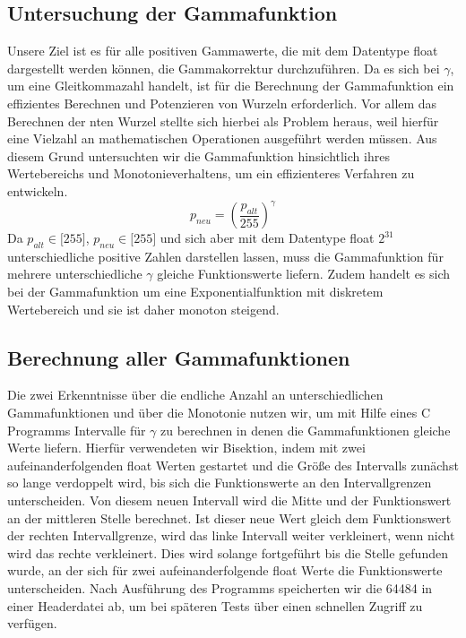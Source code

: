 \documentclass[course=erap]{aspdoc}
\begin{document}
\subsection{Untersuchung der Gammafunktion}
Unsere Ziel ist es für alle positiven Gammawerte, die mit dem Datentype float dargestellt werden können, die Gammakorrektur durchzuführen. Da es sich bei $\gamma$, um eine Gleitkommazahl handelt, ist für die Berechnung der Gammafunktion ein effizientes Berechnen und Potenzieren von Wurzeln erforderlich. Vor allem das Berechnen der nten Wurzel stellte sich hierbei als Problem heraus, weil hierfür eine Vielzahl an mathematischen Operationen ausgeführt werden müssen. Aus diesem Grund untersuchten wir die Gammafunktion hinsichtlich ihres Wertebereichs und Monotonieverhaltens, um ein effizienteres Verfahren zu entwickeln.
\begin{equation}
p_{neu} = \left(\frac{p_{alt}}{255}\right)^{\gamma}
\end{equation}   
Da $p_{alt} \in \lbrack255\rbrack$, $p_{neu} \in \lbrack255\rbrack$ und sich aber mit dem Datentype float $2^{31}$ unterschiedliche positive Zahlen darstellen lassen, muss die Gammafunktion für mehrere unterschiedliche $\gamma$ gleiche Funktionswerte liefern. Zudem handelt es sich bei der Gammafunktion um eine Exponentialfunktion mit diskretem Wertebereich und sie ist daher monoton steigend. 
\subsection{Berechnung aller Gammafunktionen}
Die zwei Erkenntnisse über die endliche Anzahl an unterschiedlichen Gammafunktionen und über die Monotonie nutzen wir, um mit Hilfe eines C Programms Intervalle für $\gamma$ zu berechnen in denen die Gammafunktionen gleiche Werte liefern. Hierfür verwendeten wir Bisektion, indem mit zwei aufeinanderfolgenden float Werten gestartet und die Größe des Intervalls zunächst so lange verdoppelt wird, bis sich die Funktionswerte an den Intervallgrenzen unterscheiden. Von diesem neuen Intervall wird die Mitte und der Funktionswert an der mittleren Stelle berechnet. Ist dieser neue Wert gleich dem Funktionswert der rechten Intervallgrenze, wird das linke Intervall weiter verkleinert, wenn nicht wird das rechte verkleinert. Dies wird solange fortgeführt bis die Stelle gefunden wurde, an der sich für zwei aufeinanderfolgende float Werte die Funktionswerte unterscheiden. Nach Ausführung des Programms speicherten wir die 64484 in einer Headerdatei ab, um bei späteren Tests über einen schnellen Zugriff zu verfügen.         
\end{document}
